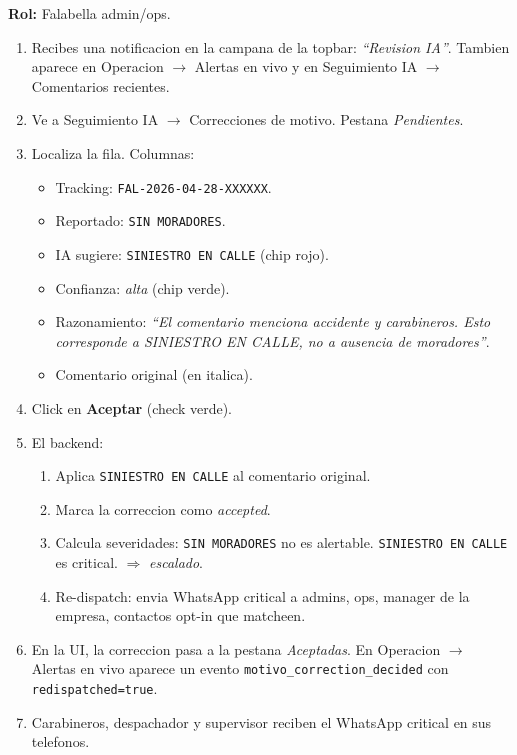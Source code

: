 \documentclass[11pt,a4paper]{article}
\begin{document}
\textbf{Rol:} Falabella admin/ops.

\begin{enumerate}
  \item Recibes una notificacion en la campana de la topbar:
        \emph{``Revision IA''}. Tambien aparece en
        Operacion $\rightarrow$ Alertas en vivo y en
        Seguimiento IA $\rightarrow$ Comentarios recientes.
  \item Ve a Seguimiento IA $\rightarrow$ Correcciones de motivo.
        Pestana \emph{Pendientes}.
  \item Localiza la fila. Columnas:
    \begin{itemize}
      \item Tracking: \texttt{FAL-2026-04-28-XXXXXX}.
      \item Reportado: \texttt{SIN MORADORES}.
      \item IA sugiere: \texttt{SINIESTRO EN CALLE} (chip rojo).
      \item Confianza: \emph{alta} (chip verde).
      \item Razonamiento: \emph{``El comentario menciona accidente y
            carabineros. Esto corresponde a SINIESTRO EN CALLE, no a
            ausencia de moradores''}.
      \item Comentario original (en italica).
    \end{itemize}
  \item Click en \textbf{Aceptar} (check verde).
  \item El backend:
    \begin{enumerate}
      \item Aplica \texttt{SINIESTRO EN CALLE} al comentario original.
      \item Marca la correccion como \emph{accepted}.
      \item Calcula severidades: \texttt{SIN MORADORES} no es
            alertable. \texttt{SINIESTRO EN CALLE} es critical.
            $\Rightarrow$ \emph{escalado}.
      \item Re-dispatch: envia WhatsApp critical a admins, ops, manager
            de la empresa, contactos opt-in que matcheen.
    \end{enumerate}
  \item En la UI, la correccion pasa a la pestana \emph{Aceptadas}.
        En Operacion $\rightarrow$ Alertas en vivo aparece un evento
        \texttt{motivo\_correction\_decided} con
        \texttt{redispatched=true}.
  \item Carabineros, despachador y supervisor reciben el WhatsApp
        critical en sus telefonos.
\end{enumerate}
\end{document}
